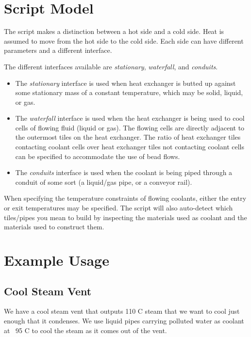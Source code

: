 \documentclass{article}
\numberwithin{equation}{subsection}
\theoremstyle{remark}
\begin{document}
\section{Script Model}

The script makes a distinction between a hot side and a cold side.
Heat is assumed to move from the hot side to the cold side.
Each side can have different parameters and a different interface.

The different interfaces available are \emph{stationary}, \emph{waterfall}, and \emph{conduits}.

\begin{itemize}
\item The \emph{stationary} interface is used when heat exchanger is butted up against some stationary mass of a constant temperature, which may be solid, liquid, or gas.

\item The \emph{waterfall} interface is used when the heat exchanger is being used to cool cells of flowing fluid (liquid or gas).
The flowing cells are directly adjacent to the outermost tiles on the heat exchanger.
The ratio of heat exchanger tiles contacting coolant cells over heat exchanger tiles not contacting coolant cells can be specified to accommodate the use of bead flows.

\item The \emph{conduits} interface is used when the coolant is being piped through a conduit of some sort (a liquid/gas pipe, or a conveyor rail).
\end{itemize}

When specifying the temperature constraints of flowing coolants, either the entry or exit temperatures may be specified.
The script will also auto-detect which tiles/pipes you mean to build by inspecting the materials used as coolant and the materials used to construct them.

\section{Example Usage}

\subsection{Cool Steam Vent}

We have a cool steam vent that outputs 110 \degree{}C steam that we want to cool just enough that it condenses.  We use liquid pipes carrying polluted water as coolant at ~95 \degree{}C to cool the steam as it comes out of the vent.
\end{document}
